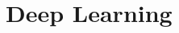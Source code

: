 \documentclass[11pt]{book}
\begin{document}
\chapter[Deep Learning]
{Deep Learning}


\printindex





\end{document}
